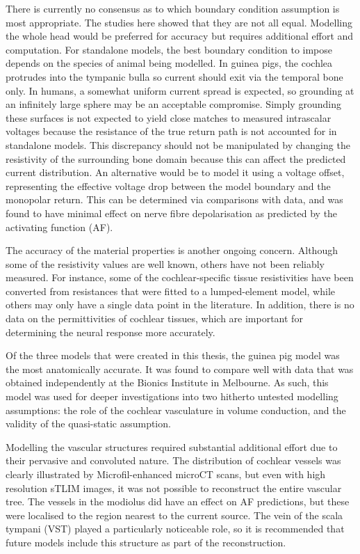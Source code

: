 There is currently no consensus as to which boundary condition assumption is
most appropriate. The studies here showed that they are not all equal. Modelling
the whole head would be preferred for accuracy but requires additional effort
and computation. For standalone models, the best boundary condition to impose
depends on the species of animal being modelled. In guinea pigs, the cochlea
protrudes into the tympanic bulla so current should exit via the temporal bone
only. In humans, a somewhat uniform current spread is expected, so grounding at
an infinitely large sphere may be an acceptable compromise. Simply grounding
these surfaces is not expected to yield close matches to measured intrascalar
voltages because the resistance of the true return path is not accounted for in
standalone models. This discrepancy should not be manipulated by changing the
resistivity of the surrounding bone domain because this can affect the predicted
current distribution. An alternative would be to model it using a voltage
offset, representing the effective voltage drop between the model boundary and
the monopolar return. This can be determined via comparisons with \invivo{}
data, and was found to have minimal effect on nerve fibre depolarisation as
predicted by the activating function (AF).

The accuracy of the material properties is another ongoing concern. Although
some of the resistivity values are well known, others have not been reliably
measured. For instance, some of the cochlear-specific tissue resistivities have
been converted from resistances that were fitted to a lumped-element model,
while others may only have a single data point in the literature. In addition,
there is no data on the permittivities of cochlear tissues, which are important
for determining the neural response more accurately.

Of the three models that were created in this thesis, the guinea pig model was
the most anatomically accurate. It was found to compare well with \invivo{} data
that was obtained independently at the Bionics Institute in Melbourne. As such,
this model was used for deeper investigations into two hitherto untested
modelling assumptions: the role of the cochlear vasculature in volume
conduction, and the validity of the quasi-static assumption.

Modelling the vascular structures required substantial additional effort due to
their pervasive and convoluted nature. The distribution of cochlear vessels was
clearly illustrated by Microfil-enhanced microCT scans, but even with high
resolution sTLIM images, it was not possible to reconstruct the entire vascular
tree. The vessels in the modiolus did have an effect on AF predictions, but
these were localised to the region nearest to the current source. The vein of
the scala tympani (VST) played a particularly noticeable role, so it is
recommended that future models include this structure as part of the
reconstruction.

